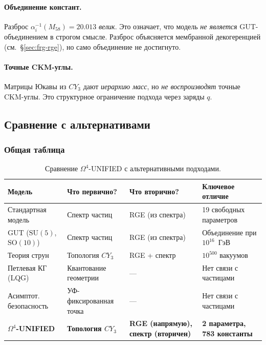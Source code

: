 \documentclass[11pt,a4paper]{article}
\newcommand{\SU}{\ensuremath{\mathrm{SU}}}
\newcommand{\SO}{\ensuremath{\mathrm{SO}}}
\newcommand{\CY}{\ensuremath{CY_3}}
\newcommand{\Om}{\ensuremath{\Omega^4}}
\theoremstyle{definition}
\begin{document}
\paragraph{Объединение констант.}
Разброс $\alpha_i^{-1}(M_{58}) = 20.013$ \emph{велик}.
Это означает, что модель \emph{не является} GUT-объединением
в строгом смысле. Разброс объясняется мембранной декогеренцией
(см.~\S\ref{sec:frg-rge}), но само объединение не достигнуто.

\paragraph{Точные CKM-углы.}
Матрицы Юкавы из $\CY$ дают \emph{иерархию масс},
но \emph{не воспроизводят} точные CKM-углы. Это структурное
ограничение подхода через заряды $q$.

\subsection{Сравнение с альтернативами}
\label{subsec:disc-comparison}

\subsubsection{Общая таблица}

\begin{table}[ht]
\centering
\caption{Сравнение \texorpdfstring{$\Om$}{}-UNIFIED с альтернативными подходами.}
\label{tab:comparison-alternatives}
\begin{tabular}{p{3.5cm}p{3cm}p{3cm}p{3cm}}
\toprule
Модель & Что первично? & Что вторично? & Ключевое отличие \\
\midrule
Стандартная модель & Спектр частиц & RGE (из спектра) &
19 свободных параметров \\[0.3em]
GUT ($\SU(5)$, $\SO(10)$) & Спектр частиц & RGE (из спектра) &
Объединение при $10^{16}$~ГэВ \\[0.3em]
Теория струн & Топология $\CY$ & RGE + спектр &
$10^{500}$ вакуумов \\[0.3em]
Петлевая КГ (LQG) & Квантование геометрии & --- &
Нет связи с частицами \\[0.3em]
Асимптот. безопасность & УФ-фиксированная точка & --- &
Нет связи с частицами \\[0.3em]
\textbf{$\Om$-UNIFIED} & \textbf{Топология $\CY$} &
\textbf{RGE (напрямую), спектр (вторичен)} &
\textbf{2 параметра, 783 константы} \\
\bottomrule
\end{tabular}
\end{table}
\end{document}
